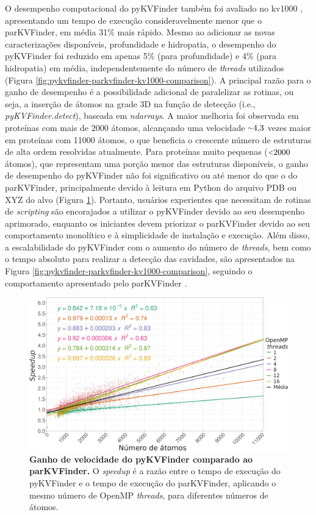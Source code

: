 \documentclass[Portugues]{phdquali}
\newcommand{\aproximadamente}{\raise.2ex\hbox{$\scriptstyle\sim$}}
\newcommand{\less}{\raise.2ex\hbox{$\scriptstyle{<}$}}
\def\ie{i.e.\onedot}
\begin{document}
O desempenho computacional do pyKVFinder também foi avaliado no kv1000 \cite{guerra2020}, apresentando um tempo de execução consideravelmente menor que o parKVFinder, em média 31\% mais rápido. Mesmo ao adicionar as novas caracterizações disponíveis, profundidade e hidropatia, o desempenho do pyKVFinder foi reduzido em apenas 5\% (para profundidade) e 4\% (para hidropatia) em média, independentemente do número de \textit{threads} utilizados (Figura \ref{fig:pykvfinder-parkvfinder-kv1000-comparison}). A principal razão para o ganho de desempenho é a possibilidade adicional de paralelizar as rotinas, ou seja, a inserção de átomos na grade 3D na função de detecção (\ie, \textit{pyKVFinder.detect}), baseada em \textit{ndarrays}. A maior melhoria foi observada em proteínas com mais de 2000 átomos, alcançando uma velocidade $\aproximadamente4{,}3$ vezes maior em proteínas com 11000 átomos, o que beneficia o crescente número de estruturas de alta ordem resolvidas atualmente. Para proteínas muito pequenas ($\less2000$ átomos), que representam uma porção menor das estruturas disponíveis, o ganho de desempenho do pyKVFinder não foi significativo ou até menor do que o do parKVFinder, principalmente devido à leitura em Python do arquivo PDB ou XYZ do alvo (Figura \ref{fig:pykvfinder-speedup}). Portanto, usuários experientes que necessitam de rotinas de \textit{scripting} são encorajados a utilizar o pyKVFinder devido ao seu desempenho aprimorado, enquanto os iniciantes devem priorizar o parKVFinder devido ao seu comportamento monolítico e à simplicidade de instalação e execução. Além disso, a escalabilidade do pyKVFinder com o aumento do número de \textit{threads}, bem como o tempo absoluto para realizar a detecção das cavidades, são apresentados na Figura \ref{fig:pykvfinder-parkvfinder-kv1000-comparison}, seguindo o comportamento apresentado pelo parKVFinder \cite{guerra2020}.

\begin{figure}[ht]
  \centering
  \includegraphics[scale=0.8]{images/pykvfinder-speedup.png}
  \caption[Ganho de velocidade do pyKVFinder comparado ao parKVFinder]{\textbf{Ganho de velocidade do pyKVFinder comparado ao parKVFinder.} O \textit{speedup} é a razão entre o tempo de execução do pyKVFinder e o tempo de execução do parKVFinder, aplicando o mesmo número de OpenMP \textit{threads}, para diferentes números de átomos.}
  \label{fig:pykvfinder-speedup}
\end{figure}
\end{document}
